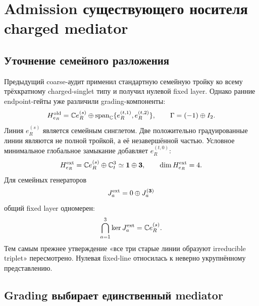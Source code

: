 \chapter{Admission существующего носителя charged mediator}
\label{ch:v8-charged-mediator-existing-carrier-admission}

\section{Уточнение семейного разложения}

Предыдущий coarse-аудит применил стандартную семейную тройку ко всему
трёхкратному charged-singlet типу и получил нулевой fixed layer. Однако
ранние endpoint-гейты уже различили grading-компоненты:
\begin{equation}
 H_{e_R}^{\rm old}=\mathbb C e_R^{(s)}
 \oplus\operatorname{span}_{\mathbb C}
 \{e_R^{(t,1)},e_R^{(t,2)}\},
 \qquad \Gamma=(-1)\oplus I_2.
 \label{eq:v8-mediator-existing-old-decomposition}
\end{equation}
Линия $e_R^{(s)}$ является семейным синглетом. Две положительно
градуированные линии являются не полной тройкой, а её незавершённой частью.
Условное минимальное глобальное замыкание добавляет $e_R^{(t,0)}$:
\begin{equation}
 H_{e_R}^{\rm ext}=\mathbb C e_R^{(s)}\oplus\mathbb C^3_t
 \simeq\mathbf1\oplus\mathbf3,
 \qquad \dim H_{e_R}^{\rm ext}=4.
 \label{eq:v8-mediator-existing-one-plus-three}
\end{equation}
Для семейных генераторов
\begin{equation}
 J_a^{\rm ext}=0\oplus J_a^{(\mathbf3)}
 \label{eq:v8-mediator-existing-family-action}
\end{equation}
общий fixed layer одномерен:
\begin{equation}
 \bigcap_{a=1}^{3}\ker J_a^{\rm ext}
 =\mathbb C e_R^{(s)}.
 \label{eq:v8-mediator-existing-fixed-line}
\end{equation}
Тем самым прежнее утверждение «все три старые линии образуют irreducible
triplet» пересмотрено. Нулевая fixed-line относилась к неверно укрупнённому
представлению.

\section{Grading выбирает единственный mediator}

